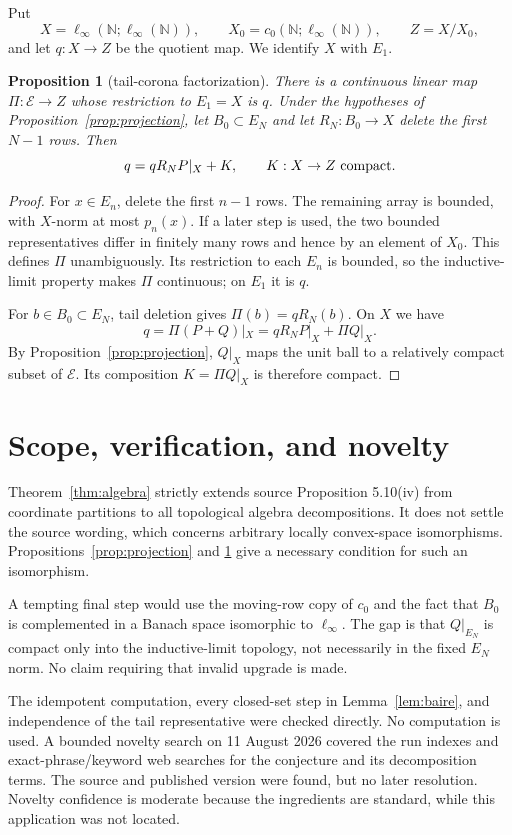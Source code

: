 \documentclass[10pt]{article}
\newtheorem{proposition}[theorem]{Proposition}
\newcommand{\N}{\mathbb N}
\newcommand{\E}{\mathcal E}
\begin{document}
Put
\[
 X=\ell_\infty(\N;\ell_\infty(\N)),\qquad
 X_0=c_0(\N;\ell_\infty(\N)),\qquad Z=X/X_0,
\]
and let $q:X\to Z$ be the quotient map.  We identify $X$ with $E_1$.

\begin{proposition}[tail-corona factorization]\label{prop:corona}
There is a continuous linear map $\Pi:\E\to Z$ whose restriction to $E_1=X$
is $q$.  Under the hypotheses of Proposition~\ref{prop:projection}, let
$B_0\subset E_N$ and let $R_N:B_0\to X$ delete the first $N-1$ rows.  Then
\[
                  q=qR_NP|_X+K,
                  \qquad K:X\to Z\ \hbox{compact}.
\]
\end{proposition}

\begin{proof}
For $x\in E_n$, delete the first $n-1$ rows.  The remaining array is bounded,
with $X$-norm at most $p_n(x)$.  If a later step is used, the two bounded
representatives differ in finitely many rows and hence by an element of $X_0$.
This defines $\Pi$ unambiguously.  Its restriction to each $E_n$ is bounded,
so the inductive-limit property makes $\Pi$ continuous; on $E_1$ it is $q$.

For $b\in B_0\subset E_N$, tail deletion gives
$\Pi(b)=qR_N(b)$.  On $X$ we have
\[
 q=\Pi(P+Q)|_X=qR_NP|_X+\Pi Q|_X.
\]
By Proposition~\ref{prop:projection}, $Q|_X$ maps the unit ball to a relatively
compact subset of $\E$.  Its composition $K=\Pi Q|_X$ is therefore compact.
\end{proof}

\section*{Scope, verification, and novelty}

Theorem~\ref{thm:algebra} strictly extends source Proposition 5.10(iv) from
coordinate partitions to all topological algebra decompositions.  It does not
settle the source wording, which concerns arbitrary locally convex-space
isomorphisms.  Propositions~\ref{prop:projection} and \ref{prop:corona} give a
necessary condition for such an isomorphism.

A tempting final step would use the moving-row copy of $c_0$ and the fact that
$B_0$ is complemented in a Banach space isomorphic to $\ell_\infty$.  The gap
is that $Q|_{E_N}$ is compact only into the inductive-limit topology, not
necessarily in the fixed $E_N$ norm.  No claim requiring that invalid upgrade
is made.

The idempotent computation, every closed-set step in Lemma~\ref{lem:baire},
and independence of the tail representative were checked directly.  No
computation is used.  A bounded novelty search on 11 August 2026 covered the
run indexes and exact-phrase/keyword web searches for the conjecture and its
decomposition terms.  The source and published version were found, but no
later resolution.  Novelty confidence is moderate because the ingredients are
standard, while this application was not located.
\end{document}
